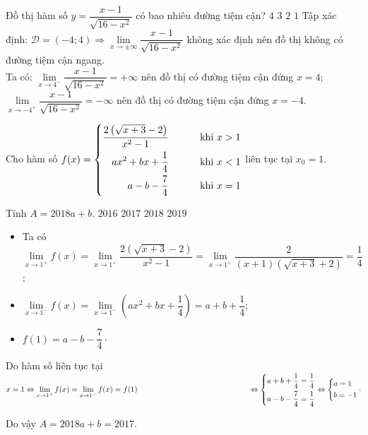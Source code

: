 \begin{ex}%
Đồ thị hàm số $ y = \dfrac{x-1}{\sqrt{16-x^2}} $	có bao nhiêu đường tiệm cận?
		\choice
	{$ 4 $}
	{$ 3 $}
	{\True $ 2 $}
	{$ 1 $}
	\loigiai
	{	
Tập xác định: $ \mathscr{D} = (-4;4) \Rightarrow  \lim\limits_{x \to \pm \infty } \dfrac{x-1}{\sqrt {16-x^2}}$ không xác định nên đồ thị không có đường tiệm cận ngang.\\
Ta có: $ \lim\limits_{x \to 4^-} \dfrac{x-1}{\sqrt {16-x^2}} = + \infty $	 nên đồ thị có đường tiệm cận đứng $ x = 4; $\\
		\hspace*{1.1cm}$ \lim\limits_{x \to -4^+} \dfrac{x-1}{\sqrt{16-x^2}} = - \infty $	 nên đồ thị có đường tiệm cận đứng $ x = -4. $\\
	}
\end{ex}
\begin{ex}%
Cho hàm số $ f(x) = \left\{\begin{aligned}\dfrac{2\left(\sqrt{x+3} - 2\right)}{x^2 - 1} \text{\hspace*{1cm} khi } x > 1\\ ax^2 + bx + \dfrac{1}{4} \text{\hspace*{1cm} khi } x < 1\\ a - b - \dfrac{7}{4} \text{\hspace*{1cm} khi } x = 1\end{aligned}\right. $ liên tục tại $ x_0 = 1 $. 

Tính $ A = 2018a + b. $
		\choice
	{$ 2016 $}
	{\True $ 2017 $}
	{$ 2018 $}
	{$ 2019 $}
	\loigiai
	{	
	\begin{itemize}
		\item 	Ta có $ \lim\limits_{x \to 1^+} f(x) =  \lim\limits_{x \to 1^+} \dfrac{2\left(\sqrt{x+3} - 2\right)}{x^2 - 1} =  \lim\limits_{x \to 1^+} \dfrac{2}{(x+1)\left(\sqrt{x+3} + 2\right)} = \dfrac{1}{4}   $;	
		\item $ \lim\limits_{x \to 1^-} f(x) =  \lim\limits_{x \to 1^-} \left(ax^2 + bx + \dfrac{1}{4}\right) = a + b + \dfrac{1}{4};  $
		\item $ f(1) = a - b - \dfrac{7}{4} \cdot  $
	\end{itemize}
	Do hàm số liên tục tại $ x = 1 \Leftrightarrow  \lim\limits_{x \to 1^+} f(x) =  \lim\limits_{x \to 1^-} f(x) = f(1)\\ \hspace*{5.1cm} \Leftrightarrow \heva{a + b + \dfrac{1}{4} = \dfrac{1}{4}\\ a - b - \dfrac{7}{4} = \dfrac{1}{4}}  \Leftrightarrow \heva{&a = 1\\&b=-1} \cdot  $
	
	Do vậy $ A = 2018a + b = 2017. $
	}
\end{ex}

